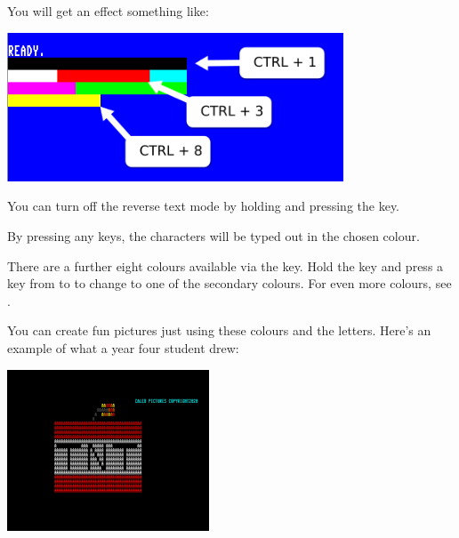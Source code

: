 You will get an effect something like:


\begin{center}
\includegraphics[width={10cm}]{images/introduction-screen/colour-bars.png}
\end{center}


You can turn off the reverse text mode by holding  and pressing the  key.

By pressing any keys, the characters will be typed out in the chosen colour.

There are a further eight colours available via the \megasymbolkey key. Hold the \megasymbolkey key and press a key from  to  to change to one of the secondary colours. For even more colours, see .

\needspace{4cm}
You can create fun pictures just using these colours and the letters.  Here's an example of what a year four student drew:

\begin{center}
\includegraphics[width={6cm}]{images/caleb-PETSCII-TNT-final}
\end{center}

